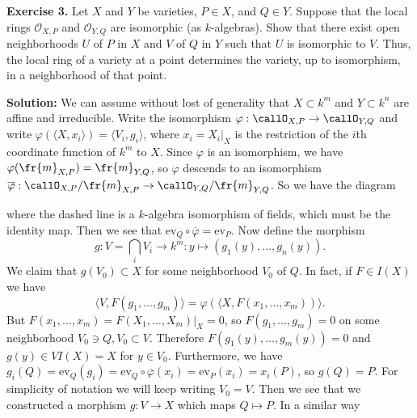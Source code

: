 \begin{dang}
\textbf{Exercise 3.} 
Let $X$ and $Y$ be varieties, $P\in X$, and $Q\in Y$. Suppose that the local rings
$\mathcal{O}_{X,P}$ and $\mathcal{O}_{Y,Q}$ are isomorphic (as $k$-algebras).
Show that there exist open neighborhoods $U$ of $P$ in $X$ and $V$ of $Q$ in $Y$
such that $U$ is isomorphic to $V$. Thus, the local ring of a variety at a point
determines the variety, up to isomorphism, in a neighborhood of that point.
\end{dang}
\textbf{Solution:} We can assume without lost of generality that $X\subset k^m$ and $Y\subset k^n$ are affine and irreducible.
Write the isomorphism $\varphi:\callO_{X,P}\to \callO_{Y,Q}$ and write 
$\varphi(\langle X, x_i\rangle)=\langle V_i, g_i\rangle$, where $x_i=X_i|_X$ is the restriction of 
the $i$th coordinate function of $k^m$ to $X$. Since $\varphi$ is an isomorphism, we have 
$\varphi(\fr{m}_{X,P})=\fr{m}_{Y,Q}$, so $\varphi$ descends to an isomorphism
$\overline{\varphi}:\callO_{X,P}/\fr{m}_{X,P}\to \callO_{Y,Q}/\fr{m}_{Y,Q}$. 
So we have the diagram 
\begin{center}
\end{center} 
where the dashed line is a $k$-algebra isomorphism of fields, which must be the identity map. Then we see that 
$\text{ev}_Q \circ\overline{\varphi} = \text{ev}_P$. Now define the morphism 
\begin{equation}
    g: V = \bigcap_i V_i \to k^m: y\mapsto (g_1(y),\dots, g_n(y)).
\end{equation}
We claim that $g(V_0)\subset X$ for some neighborhood $V_0$ of $Q$. In fact, if $F\in I(X)$ we have 
\begin{equation}
    \langle V,F(g_1,\dots,g_m)\rangle = \varphi(\langle X, F(x_1,\dots,x_m))\rangle.
\end{equation}
But $F(x_1,\dots,x_m)=F(X_1,\dots,X_m)|_X=0$, so 
$F(g_1,\dots, g_m)=0$ on some neighborhood $V_0\ni Q, V_0\subset V$. Therefore 
$F(g_1(y),\dots, g_m(y))=0$ and $g(y)\in VI(X)=X$ for $y\in V_0$. Furthermore, we have 
$g_i(Q) = \text{ev}_Q(g_i) = \text{ev}_Q\circ\overline{\varphi}(x_i)=\text{ev}_P(x_i)=x_i(P)$, so 
$g(Q)=P$. For simplicity of notation we will keep writing $V_0=V$. 
Then we see that we constructed a morphism $g:V\to X$ which maps $Q\mapsto P$. In a similar way 
